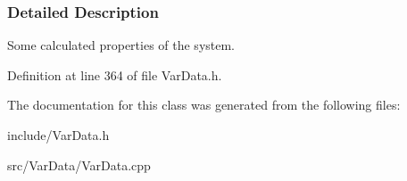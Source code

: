 \subsubsection{Detailed Description}
Some calculated properties of the system. 

Definition at line 364 of file Var\+Data.\+h.



The documentation for this class was generated from the following files\+:\begin{DoxyCompactItemize}
\item 
include/Var\+Data.\+h\item 
src/\+Var\+Data/Var\+Data.\+cpp\end{DoxyCompactItemize}
